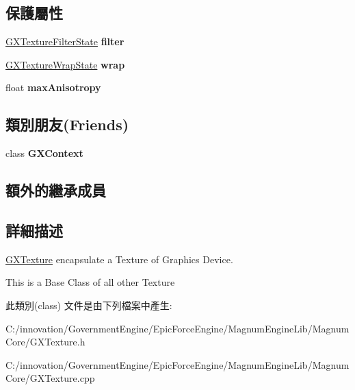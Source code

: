 \subsection*{保護屬性}
\begin{DoxyCompactItemize}
\item 
\hyperlink{class_i_dream_sky_1_1_g_x_texture_filter_state}{G\+X\+Texture\+Filter\+State} {\bfseries filter}\hypertarget{class_i_dream_sky_1_1_g_x_texture_a194c8b8f77071018643272ef5153cb55}{}\label{class_i_dream_sky_1_1_g_x_texture_a194c8b8f77071018643272ef5153cb55}

\item 
\hyperlink{class_i_dream_sky_1_1_g_x_texture_wrap_state}{G\+X\+Texture\+Wrap\+State} {\bfseries wrap}\hypertarget{class_i_dream_sky_1_1_g_x_texture_a16616a8d839034b8125f157ba9616b07}{}\label{class_i_dream_sky_1_1_g_x_texture_a16616a8d839034b8125f157ba9616b07}

\item 
float {\bfseries max\+Anisotropy}\hypertarget{class_i_dream_sky_1_1_g_x_texture_a4a552eec30bd6ad7584545e5af696273}{}\label{class_i_dream_sky_1_1_g_x_texture_a4a552eec30bd6ad7584545e5af696273}

\end{DoxyCompactItemize}
\subsection*{類別朋友(Friends)}
\begin{DoxyCompactItemize}
\item 
class {\bfseries G\+X\+Context}\hypertarget{class_i_dream_sky_1_1_g_x_texture_a2c36d7f8865080802bbad88cd73d871c}{}\label{class_i_dream_sky_1_1_g_x_texture_a2c36d7f8865080802bbad88cd73d871c}

\end{DoxyCompactItemize}
\subsection*{額外的繼承成員}


\subsection{詳細描述}
\hyperlink{class_i_dream_sky_1_1_g_x_texture}{G\+X\+Texture} encapsulate a Texture of Graphics Device. 

This is a Base Class of all other Texture 

此類別(class) 文件是由下列檔案中產生\+:\begin{DoxyCompactItemize}
\item 
C\+:/innovation/\+Government\+Engine/\+Epic\+Force\+Engine/\+Magnum\+Engine\+Lib/\+Magnum\+Core/G\+X\+Texture.\+h\item 
C\+:/innovation/\+Government\+Engine/\+Epic\+Force\+Engine/\+Magnum\+Engine\+Lib/\+Magnum\+Core/G\+X\+Texture.\+cpp\end{DoxyCompactItemize}
